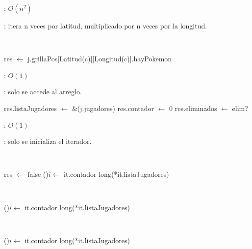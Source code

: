 \begin{Algoritmos}
	\complejidad: $O(n^2)$

	\justifcomp: itera n veces por latitud, multiplicado por n veces por la longitud.

	
	~

	\begin{algorithm}[H]
		\NoCaptionOfAlgo
		\caption{}
		\BlankLine
		res $\leftarrow$ j.grillaPos[Latitud(c)][Longitud(c)].hayPokemon
	\end{algorithm}

	\complejidad: $O(1)$

	\justifcomp: solo se accede al arreglo.


	\begin{algorithm}[H]
		\NoCaptionOfAlgo
		\caption{}
		res.listaJugadores $\leftarrow$ \&(j.jugadores)
		res.contador $\leftarrow$ 0
		res.eliminados $\leftarrow$ elim?
	\end{algorithm}

	\complejidad: $O(1)$

	\justifcomp: solo se inicializa el iterador.

	~

	\begin{algorithm}[H]
		\NoCaptionOfAlgo
		\caption{}
		res $\leftarrow$ false
		\For(){$i \leftarrow$ it.contador \KwTo long(*it.listaJugadores)}{
		}
	\end{algorithm}

	~

	\begin{algorithm}[H]
		\NoCaptionOfAlgo
		\caption{}
		\For(){$i \leftarrow$ it.contador \KwTo long(*it.listaJugadores)}{
		}
	\end{algorithm}

	~

	\begin{algorithm}[H]
		\NoCaptionOfAlgo
		\caption{}
		\For(){$i \leftarrow$ it.contador \KwTo long(*it.listaJugadores)}{
		}
	\end{algorithm}


\end{Algoritmos}
